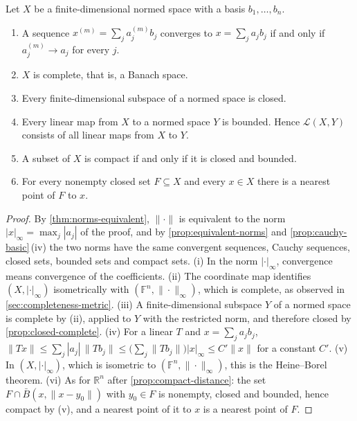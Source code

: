 \begin{corollary}
\label{cor:finite-dimensional}
Let $X$ be a finite-dimensional normed space with a basis $b_1,\ldots,b_n$.
\begin{enumerate}
\item A sequence $x^{(m)}=\sum_ja^{(m)}_jb_j$ converges to $x=\sum_ja_jb_j$ if and only if $a^{(m)}_j\to a_j$ for every $j$.
\item $X$ is complete, that is, a Banach space.
\item Every finite-dimensional subspace of a normed space is closed.
\item Every linear map from $X$ to a normed space $Y$ is bounded. Hence $\mathcal L(X,Y)$ consists of all linear maps from $X$ to $Y$.
\item A subset of $X$ is compact if and only if it is closed and bounded.
\item For every nonempty closed set $F\subseteq X$ and every $x\in X$ there is a nearest point of $F$ to $x$.
\end{enumerate}
\end{corollary}

\begin{proof}
By \cref{thm:norms-equivalent}, $\|\cdot\|$ is equivalent to the norm $|x|_\infty=\max_j|a_j|$ of the proof, and by \cref{prop:equivalent-norms} and \cref{prop:cauchy-basic}\,(iv) the two norms have the same convergent sequences, Cauchy sequences, closed sets, bounded sets and compact sets. (i) In the norm $|\cdot|_\infty$, convergence means convergence of the coefficients. (ii) The coordinate map identifies $(X,|\cdot|_\infty)$ isometrically with $(\mathbb F^n,\|\cdot\|_\infty)$, which is complete, as observed in \cref{sec:completeness-metric}. (iii) A finite-dimensional subspace $Y$ of a normed space is complete by (ii), applied to $Y$ with the restricted norm, and therefore closed by \cref{prop:closed-complete}. (iv) For a linear $T$ and $x=\sum_ja_jb_j$, $\|Tx\|\le\sum_j|a_j|\,\|Tb_j\|\le\bigl(\sum_j\|Tb_j\|\bigr)|x|_\infty\le C'\|x\|$ for a constant $C'$. (v) In $(X,|\cdot|_\infty)$, which is isometric to $(\mathbb F^n,\|\cdot\|_\infty)$, this is the Heine--Borel theorem. (vi) As for $\mathbb R^n$ after \cref{prop:compact-distance}: the set $F\cap\bar B(x,\|x-y_0\|)$ with $y_0\in F$ is nonempty, closed and bounded, hence compact by (v), and a nearest point of it to $x$ is a nearest point of $F$.
\end{proof}

